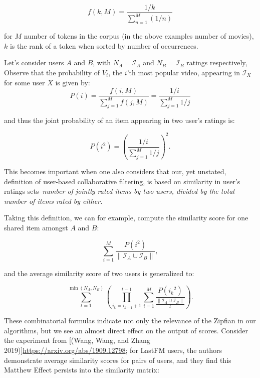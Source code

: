 \begin{equation}
    f(k, M) = \frac{1/k}{\sum^M_{n=1}(1/n)}    
\end{equation}


for $M$ number of tokens in the corpus (in the above examples number of movies), $k$ is the rank of a token when sorted by number of occurrences. 

Let's consider users $A$ and $B$, with $N_A = \mathcal{I}_A$  and $N_B = \mathcal{I}_B$ ratings respectively, Observe that the probability of $V_i$, the $i$'th most popular video, appearing in $\mathcal{I}_X$ for some user $X$ is given by:
\begin{equation}
    P(i)=\frac{f(i,M)}{\sum^M_{j=1}f(j,M)}=\frac{1/i}{\sum^M_{j=1}1/j}
\end{equation}

and thus the joint probability of an item appearing in two user's ratings is:

\begin{equation}
  P(i^2)=\left(\frac{1/i}{\sum^M_{j=1}1/j}\right)^2.  
\end{equation}

This becomes important when one also considers that our, yet unstated, definition of user-based collaborative filtering, is based on similarity in user's ratings sets–\emph{number of jointly rated items by two users, divided by the total number of items rated by either.}

Taking this definition, we can for example, compute the similarity score for one shared item amongst $A$ and $B$:

\begin{equation}
    \sum^M_{i=1} \frac{P(i^2)}{\| \mathcal{I}_A \cup \mathcal{I}_B \|},
\end{equation}

and the average similarity score of two users is generalized to:

\begin{equation}
    \sum^{\min(N_A,N_B)}_{t=1}\left(\prod_{i_k=i_{k-1}+1}^{t-1}\sum^M_{i=1} \frac{P({i_k}^2)}{\frac{\| \mathcal{I}_A \cup \mathcal{I}_B \|}{t}}\right).
\end{equation}

These combinatorial formulas indicate not only the relevance of the Zipfian in our algorithms, but we see an almost direct effect on the output of scores. Consider the experiment from [(Wang, Wang, and Zhang 2019)]\url{https://arxiv.org/abs/1909.12798}; for LastFM users, the authors demonstrate average similarity scores for pairs of users, and they find this Matthew Effect persists into the similarity matrix:

